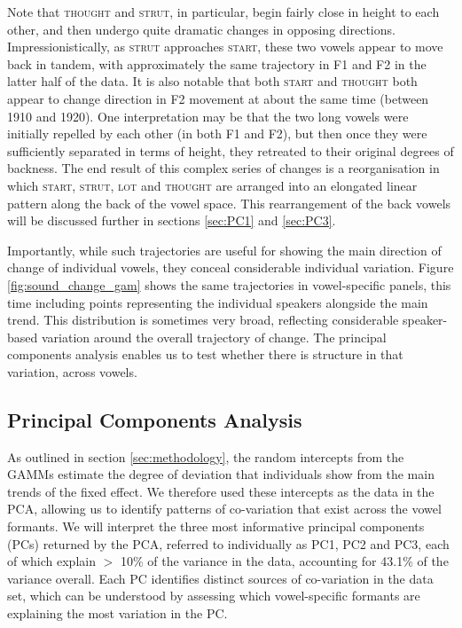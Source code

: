 \documentclass[review]{elsarticle} %
\begin{document}
Note that \textsc{thought} and \textsc{strut}, in particular, begin fairly close in height to each other, and then undergo quite dramatic changes in opposing directions. Impressionistically, as \textsc{strut} approaches \textsc{start}, these two vowels appear to move back in tandem, with approximately the same trajectory in F1 and F2 in the latter half of the data.  It is also notable that both \textsc{start} and \textsc{thought} both appear to change direction in F2 movement at about the same time (between 1910 and 1920).  One interpretation may be that the two long vowels were initially repelled by each other (in both F1 and F2), but then once they were sufficiently separated in terms of height, they retreated to their original degrees of backness. The end result of this complex series of changes is a reorganisation in which \textsc{start}, \textsc{strut}, \textsc{lot} and \textsc{thought} are arranged into an elongated linear pattern along the back of the vowel space.   This rearrangement of the back vowels will be discussed further in sections \ref{sec:PC1} and \ref{sec:PC3}.

Importantly, while such trajectories are useful for showing the main direction of change of individual vowels, they conceal considerable individual variation.  Figure \ref{fig:sound_change_gam} shows the same trajectories in vowel-specific panels, this time including points representing the individual speakers alongside the main trend.  This distribution is sometimes very broad, reflecting considerable speaker-based variation around the overall trajectory of change.   The principal components analysis enables us to test whether there is structure in that variation, across vowels.


\subsection{Principal Components Analysis}
\label{sec:interpreting}

As outlined in section \ref{sec:methodology}, the random intercepts from the GAMMs estimate the degree of deviation that individuals show from the main trends of the fixed effect. We therefore used these intercepts as the data in the PCA, allowing us to identify patterns of co-variation that exist across the vowel formants. We will interpret the three most informative principal components (PCs) returned by the PCA, referred to individually as PC1, PC2 and PC3, each of which explain $>$ 10\% of the variance in the data, accounting for 43.1\% of the variance overall. Each PC identifies distinct sources of co-variation in the data set, which can be understood by assessing which vowel-specific formants are explaining the most variation in the PC. 
\end{document}
